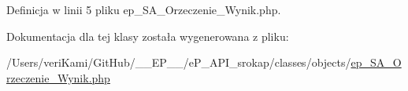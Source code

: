 Definicja w linii 5 pliku ep\-\_\-\-S\-A\-\_\-\-Orzeczenie\-\_\-\-Wynik.\-php.



Dokumentacja dla tej klasy została wygenerowana z pliku\-:\begin{DoxyCompactItemize}
\item 
/\-Users/veri\-Kami/\-Git\-Hub/\-\_\-\-\_\-\-E\-P\-\_\-\-\_\-/e\-P\-\_\-\-A\-P\-I\-\_\-srokap/classes/objects/\hyperlink{ep___s_a___orzeczenie___wynik_8php}{ep\-\_\-\-S\-A\-\_\-\-Orzeczenie\-\_\-\-Wynik.\-php}\end{DoxyCompactItemize}
